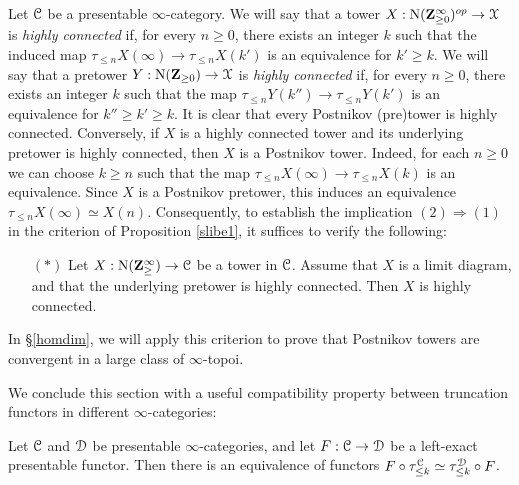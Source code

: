 \begin{remark}\label{urkan}
Let $\operatorname{\mathcal{C}}$ be a presentable $\infty$-category. We will say that a tower
$X: \operatorname{N}( \mathbf{Z}^{\infty}_{\geq 0})^{op} \rightarrow \operatorname{\mathcal{X}}$ is {\it highly connected} if, for every $n \geq 0$, there exists an integer $k$ such that the induced map $\tau_{\leq n} X(\infty) \rightarrow \tau_{\leq n} X(k')$ is an equivalence for $k' \geq k$. We will say that a pretower 
$Y: \operatorname{N}( \mathbf{Z}_{\geq 0}) \rightarrow
\operatorname{\mathcal{X}}$ is {\it highly connected} if, for every $n \geq 0$, there exists an integer $k$ such that
the map $\tau_{\leq n} Y(k'') \rightarrow \tau_{\leq n} Y(k')$ is an equivalence for $k'' \geq k' \geq k$.
It is clear that every Postnikov (pre)tower is highly connected. Conversely, if $X$ is a highly connected tower and its underlying pretower is highly connected, then $X$ is a Postnikov tower. Indeed, for each $n \geq 0$ we can choose $k \geq n$ such that the map
$\tau_{\leq n} X(\infty) \rightarrow \tau_{\leq n} X(k)$ is an equivalence. Since $X$ is a Postnikov pretower, this induces an equivalence $\tau_{\leq n} X(\infty) \simeq X(n)$. Consequently, to establish
the implication $(2) \Rightarrow (1)$ in the criterion of Proposition \ref{slibe1}, it suffices to verify the following:
\begin{itemize}
\item[$(\ast)$] Let $X: \operatorname{N}( \mathbf{Z}^{\infty}_{\geq} ) \rightarrow \operatorname{\mathcal{C}}$ be a tower in $\operatorname{\mathcal{C}}$. Assume that $X$ is a limit diagram, and that the underlying pretower is highly connected. Then $X$ is highly connected.
\end{itemize}
In \S \ref{homdim}, we will apply this criterion to prove that Postnikov towers are convergent in a large class of $\infty$-topoi.
\end{remark}

We conclude this section with a useful compatibility property between truncation functors in different $\infty$-categories:

\begin{proposition}\label{compattrunc}
Let $\operatorname{\mathcal{C}}$ and $\operatorname{\mathcal{D}}$ be presentable $\infty$-categories, and let $F: \operatorname{\mathcal{C}} \rightarrow \operatorname{\mathcal{D}}$
be a left-exact presentable functor. Then there is an equivalence of functors
$F \circ \tau_{\leq k}^{\operatorname{\mathcal{C}}} \simeq \tau_{\leq k}^{\operatorname{\mathcal{D}}} \circ F$.
\end{proposition}

